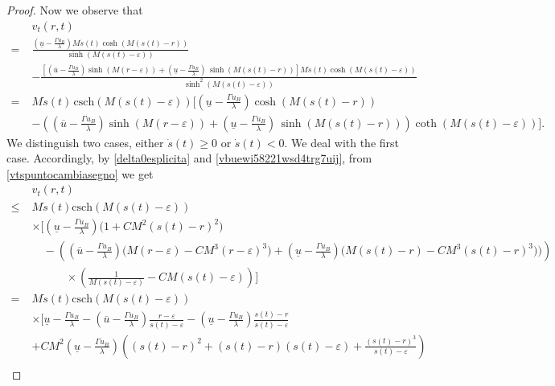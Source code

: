 \documentclass[12pt,a4paper,intlimits,sumlimits]{amsart}
\theoremstyle{definition}
\theoremstyle{plain}
\numberwithin{equation}{section}
\renewcommand{\leq}{\leqslant}
\renewcommand{\geq}{\geqslant}
\begin{document}
\begin{proof}
Now we observe that
\begin{equation}\label{vtspuntocambiasegno}
\begin{split}&
v_t(r, t)\\=\; &\frac{\left(\underline{u}-\frac{\Gamma u_B}{\lambda}\right)M\dot s(t)\cosh(M(s(t)-r))}{\sinh(M(s(t)-\varepsilon))} \\
& - \frac{\left[\left(\overline{u}-\frac{\Gamma u_B}{\lambda}\right)\sinh(M(r-\varepsilon)) + \left(\underline{u}-\frac{\Gamma u_B}{\lambda}\right)\,\sinh(M(s(t)-r))\right]M\dot s(t)\cosh(M(s(t)-\varepsilon))}{\sinh^2(M(s(t)-\varepsilon))}  \\
=\;&M\dot s(t)\,\mbox{csch}(M(s(t)-\varepsilon))\Bigg[\left(\underline{u}-\frac{\Gamma u_B}{\lambda}\right)\cosh(M(s(t)-r)) \\
&  -\left(\left(\overline{u}  -\frac{\Gamma u_B}{\lambda}\right)\sinh(M(r-\varepsilon))+\left(\underline{u}-\frac{\Gamma u_B}{\lambda}\right)\,\sinh(M(s(t)-r))\right)\coth(M(s(t)-\varepsilon))\Bigg] .
\end{split}
\end{equation}
We distinguish two cases, either $\dot s (t)\geq 0$ or $\dot s(t)<0$. We deal with the first case.
 Accordingly, by \eqref{delta0esplicita} and \eqref{vbuewi58221wsd4trg7uij}, from \eqref{vtspuntocambiasegno} we get 
\[
\begin{split}&
v_t(r, t)\\\leq\;&M\dot s(t)\mbox{csch}(M(s(t)-\varepsilon))\\&
\times\Bigg[\left(\underline{u}-\frac{\Gamma u_B}{\lambda}\right)\big(
1 + CM^2(s(t)-r)^2
\big) \\
&  \quad-\left(\left(\overline{u}  -\frac{\Gamma u_B}{\lambda}\right)
\big(M(r-\varepsilon) -CM^3(r-\varepsilon)^3
\big)+\left(\underline{u}-\frac{\Gamma u_B}{\lambda}\right)
\big(M(s(t)-r)-CM^3(s(t)-r)^3 )\big)\right)
\\
&\qquad\quad\times\left(
\frac1{M(s(t)-\varepsilon)} -CM(s(t)-\varepsilon)\right)
\Bigg]\\
=\;&M\dot s(t)\mbox{csch}(M(s(t)-\varepsilon))\\&
\times\Bigg[\underline{u}-\frac{\Gamma u_B}{\lambda}-
 \left(\overline{u}  -\frac{\Gamma u_B}{\lambda}\right)\frac{r-\varepsilon}{s(t)-\varepsilon}
-\left(\underline{u}-\frac{\Gamma u_B}{\lambda}\right)\frac{s(t)-r}{s(t)-\varepsilon} \\
&+CM^2 \left(\underline{u}  -\frac{\Gamma u_B}{\lambda}\right)\left((s(t)-r)^2+(s(t)-r)(s(t)-\varepsilon)+\frac{(s(t)-r)^3}{s(t)-\varepsilon}\right) \\

\end{split}\]
\end{proof}
\end{document}
